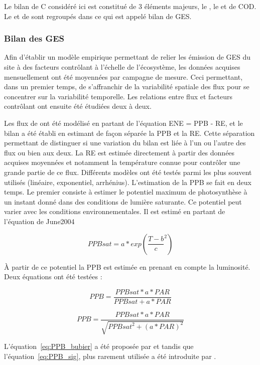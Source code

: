 Le bilan de C considéré ici est constitué de 3 éléments majeurs, le \coo, le \chh et de COD.
Le \coo et de \chh sont regroupés dans ce qui est appelé bilan de GES.

\subsubsection{Bilan des GES}

Afin d'établir un modèle empirique permettant de relier les émission de GES du site à des facteurs contrôlant à l'échelle de l'écosystème, les données acquises mensuellement ont été moyennées par campagne de mesure.
Ceci permettant, dans un premier temps, de s'affranchir de la variabilité spatiale des flux pour se concentrer sur la variabilité temporelle.
Les relations entre flux et facteurs contrôlant ont ensuite été étudiées deux à deux.

Les flux de \coo ont été modélisé en partant de l'équation ENE = PPB - RE, et le bilan a été établi en estimant de façon séparée la PPB et la RE.
Cette séparation permettant de distinguer si une variation du bilan est liée à l'un ou l'autre des flux ou bien aux deux.
La RE est estimée directement à partir des données acquises moyennées et notamment la température connue pour contrôler une grande partie de ce flux.
Différents modèles ont été testés parmi les plus souvent utilisés (linéaire, exponentiel, arrhénius).
L'estimation de la PPB se fait en deux temps.
Le premier consiste à estimer le potentiel maximum de photosynthèse à un instant donné dans des conditions de lumière saturante.
Ce potentiel peut varier avec les conditions environnementales.
Il est estimé en partant de l'équation de June2004 

\begin{equation}
PPBsat = a * exp(\frac{T - b}{c}^2)
\end{equation}

À partir de ce potentiel la PPB est estimée en prenant en compte la luminosité.
Deux équations ont été testées :

\begin{equation} \label{eq:PPB_bubier}
PPB = \frac{PPBsat * a * PAR}{PPBsat + a * PAR}
\end{equation}

\begin{equation} \label{eq:PPB_sig}
PPB = \frac{PPBsat * a * PAR}{\sqrt{PPBsat^2 + (a * PAR)^2}}
\end{equation}

L'équation~\ref{eq:PPB_bubier} a été proposée par \cite{bubier1998} et tandis que l'équation~\ref{eq:PPB_sig}, plus rarement utilisée a été introduite par \cite{smith1937}.

